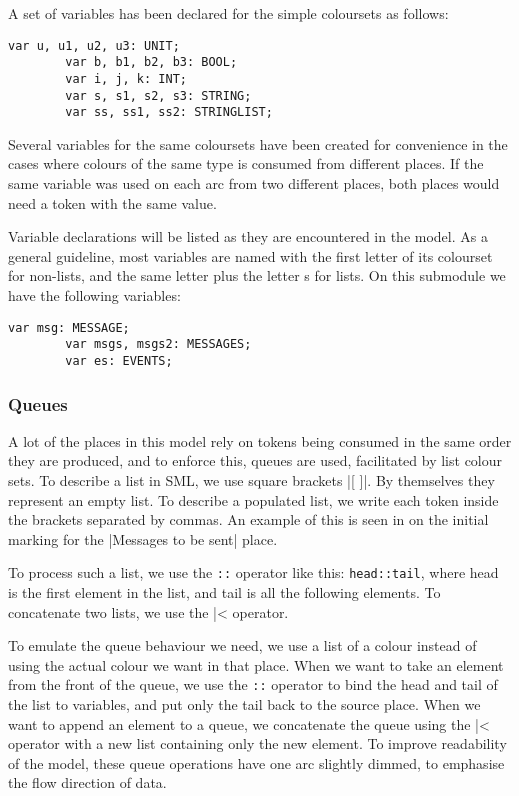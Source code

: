 		A set of variables has been declared for the simple coloursets as follows:
		
		\begin{lstlisting}[label=lst:standard_vars,caption=Simple Colourset Variables]
		var u, u1, u2, u3: UNIT;
		var b, b1, b2, b3: BOOL;
		var i, j, k: INT;
		var s, s1, s2, s3: STRING;
		var ss, ss1, ss2: STRINGLIST;
		\end{lstlisting}
		
		Several variables for the same coloursets have been created for convenience in
		the cases where colours of the same type is consumed from different places. If the same variable was
		used on each arc from two different places, both places would need a token
		with the same value. 
		
		Variable declarations will be listed as they are encountered in the model.
		As a general guideline, most variables are named with the first letter of its
		colourset for non-lists, and the same letter plus the letter s for lists. On
		this submodule we have the following variables:
		
		\begin{lstlisting}[label=lst:client_app_vars,caption=Client Application
		Variables]
		var msg: MESSAGE;
		var msgs, msgs2: MESSAGES;
		var es: EVENTS;
		\end{lstlisting}
	
	\subsubsection{Queues}
	
		A lot of the places in this model rely on tokens being consumed in the same
		order they are produced, and to enforce this, queues are used, facilitated
		by list colour sets. To describe a list in SML, we use square
		brackets |[ ]|. By themselves they represent an empty list. To describe a populated list, we
		write each token inside the brackets separated by commas. An example of this
		is seen in  on the initial marking for the
		|Messages to be sent| place.
		
		To process such a list, we use the \lstinline-::- operator like this:
		\lstinline-head::tail-, where head is the first element in the list, and tail
		is all the following elements. To concatenate two lists, we use the
		|^^| operator. 
		
		To emulate the queue behaviour we need, we use a list of a colour instead of
		using the actual colour we want in that place. When we want to take an
		element from the front of the queue, we use the \lstinline-::- operator to
		bind the head and tail of the list to variables, and put only the tail back to
		the source place. When we want to append an element to a queue, we concatenate
		the queue using the |^^| operator with a new list containing only
		the new element. To improve readability of the model, these queue operations
		have one arc slightly dimmed, to emphasise the flow direction of data.
		
